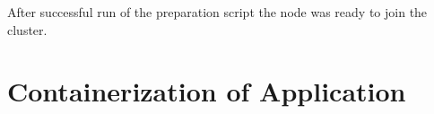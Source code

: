 After successful run of the preparation script the node was ready to join the cluster.

\section{Containerization of Application}





